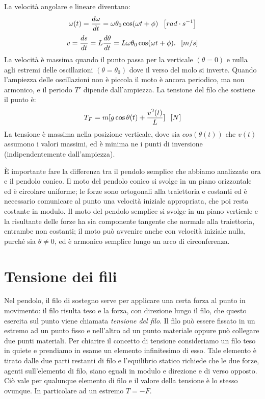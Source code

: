 \documentclass[class=book, crop=false, oneside, 12pt]{standalone}
\begin{document}
La velocità angolare e lineare diventano:
\begin{equation}
    \omega (t) = \frac{d \omega}{dt} = \omega \theta_0 \cos (\omega t + \phi) \hspace{0.2cm} \left[rad \cdot s^{-1}\right]
\end{equation}
\begin{equation}
    v = \frac{d s}{dt} = L \frac{d \theta}{ dt} = L \omega \theta_0 \cos (\omega t +\phi). \hspace{0.2cm} \left[m/s\right]
\end{equation}
La velocità è massima quando il punto passa per la verticale \((\theta = 0)\) e nulla agli estremi delle oscillazioni \((\theta= \theta_0)\) dove il verso del molo si inverte.\newline
Quando l'ampiezza delle oscillazioni non è piccola il moto è ancora periodico, ma non armonico, e il periodo \(T'\) dipende dall'ampiezza.\newline
La tensione del filo che sostiene il punto è:
\begin{equation}
    T_F = m [ g \cos \theta(t) + \frac{v^2(t)}{L} ] \hspace{0.2cm} \left[N\right]
\end{equation}
La tensione è massima nella posizione verticale, dove sia \(cos  (\theta (t))\) che \(v(t)\) assumono i valori massimi, ed è minima ne i punti di inversione (indipendentemente dall'ampiezza). 

È importante fare la differenza tra il pendolo semplice che abbiamo analizzato ora e il pendolo conico.
Il moto del pendolo conico si svolge in un piano orizzontale ed è circolare uniforme; le forze sono ortogonali alla traiettoria e costanti ed è necessario comunicare al punto una velocità iniziale appropriata, che poi resta costante in modulo. 
Il moto del pendolo semplice si svolge in un piano verticale e la risultante delle forze ha sia componente tangente che normale alla traiettoria, entrambe non costanti; il moto può avvenire anche con velocità iniziale nulla, purché sia \(\theta \neq 0\), ed è armonico semplice lungo un arco di circonferenza.

\section{Tensione dei fili}

Nel pendolo, il filo di sostegno serve per applicare una certa forza al punto in movimento: il filo risulta teso e la forza, con direzione lungo il filo, che questo esercita sul punto viene chiamata \emph{tensione del filo}. Il filo può essere fissato in un estremo ad un punto fisso e nell'altro ad un punto materiale oppure può collegare due punti materiali.\newline
Per chiarire il concetto di tensione consideriamo un filo teso in quiete e prendiamo in esame un elemento infinitesimo di esso. Tale elemento è tirato dalle due parti restanti di filo e l'equilibrio statico richiede che le due forze, agenti sull'elemento di filo, siano eguali in modulo e direzione e di verso opposto.\newline
Ciò vale per qualunque elemento di filo e il valore della tensione è lo stesso ovunque. In particolare ad un estremo \(T = -F\).
\end{document}
